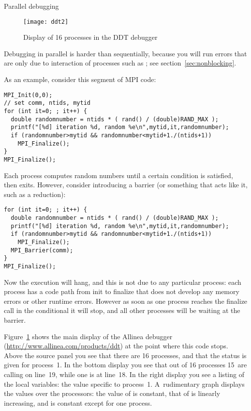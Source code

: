 
 {Parallel debugging}

\begin{figure}[ht]
\texttt{[image: ddt2]}
\caption{Display of 16 processes in the DDT debugger}
\label{fig:ddt2}
\end{figure}

Debugging in parallel is harder than sequentially, because you will run
errors that are only due to interaction of processes such as ;
see section~\ref{sec:nonblocking}.

As an example, consider this segment of MPI code:
\begin{verbatim}
MPI_Init(0,0);
// set comm, ntids, mytid
for (int it=0; ; it++) {
  double randomnumber = ntids * ( rand() / (double)RAND_MAX );
  printf("[%d] iteration %d, random %e\n",mytid,it,randomnumber);
  if (randomnumber>mytid && randomnumber<mytid+1./(ntids+1))  
    MPI_Finalize();
}
MPI_Finalize();
\end{verbatim}
Each process computes random numbers until a certain condition is satisfied, then exits.
However, consider introducing a barrier (or something that acts like it, such as a reduction):
\begin{verbatim}
for (int it=0; ; it++) {
  double randomnumber = ntids * ( rand() / (double)RAND_MAX );
  printf("[%d] iteration %d, random %e\n",mytid,it,randomnumber);
  if (randomnumber>mytid && randomnumber<mytid+1./(ntids+1))  
    MPI_Finalize();
  MPI_Barrier(comm);
}
MPI_Finalize();
\end{verbatim}
Now the execution will hang, and this is not due to any particular process:
each process has a code path from init to finalize that does not develop
any memory errors or other runtime errors.
However as soon as one process reaches the finalize call in the conditional
it will stop, and all other processes will be waiting at the barrier.

Figure~\ref{fig:ddt2} shows the main display of the Allinea 
debugger (\url{http://www.allinea.com/products/ddt}) at the point where this code stops.
Above the source panel you see that there are 16 processes, and that the status is given
for process~1.
In the bottom display you see that out of 16 processes 15~are calling  on line~19,
while one is at line~18. In the right display you see a listing of the local variables:
the value specific to process~1. A~rudimentary graph displays the values over the processors:
the value of  is constant, that of  is linearly increasing, and 
is constant except for one process.


